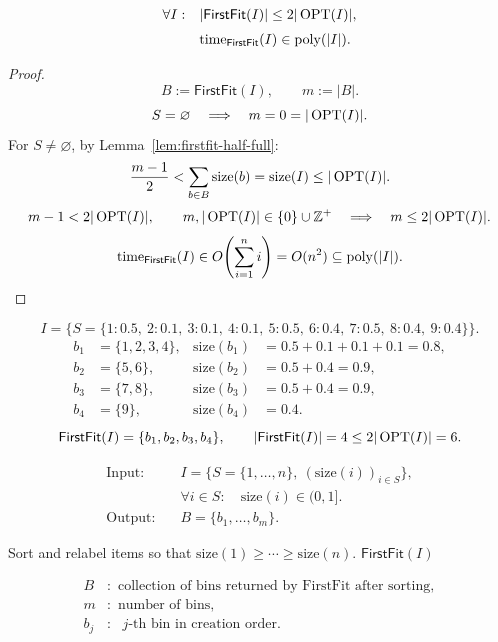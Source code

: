\documentclass[12pt,a4paper]{article}
\begin{document}
\begin{theorem}
\[
\begin{aligned}
\forall I:\quad &|\mathsf{FirstFit}(I)|\leq2|\operatorname{OPT}(I)|,\\[3pt]
&\mathrm{time}_{\mathsf{FirstFit}}(I)\in\operatorname{poly}(|I|).
\end{aligned}
\]
\end{theorem}
\begin{proof}
\[
B:=\mathsf{FirstFit}(I),\qquad m:=|B|.
\]
\[
S=\varnothing\quad\Longrightarrow\quad m=0=|\operatorname{OPT}(I)|.
\]
For $S\neq\varnothing$, by Lemma~\ref{lem:firstfit-half-full}:
\[
\frac{m-1}{2}<\sum_{b\in B}\mathrm{size}(b)
=\mathrm{size}(I)\leq|\operatorname{OPT}(I)|.
\]
\[
m-1<2|\operatorname{OPT}(I)|,\qquad m,|\operatorname{OPT}(I)|\in\{0\}\cup\mathbb Z^{+}
\quad\Longrightarrow\quad m\leq2|\operatorname{OPT}(I)|.
\]
\[
\mathrm{time}_{\mathsf{FirstFit}}(I)
\in O\!\left(\sum_{i=1}^n i\right)
=O(n^2)\subseteq\operatorname{poly}(|I|).
\]
\end{proof}

\noindent\begin{minipage}{\linewidth}
\begin{example}[FirstFit]
\[
I=\{S=\{1:0.5,\ 2:0.1,\ 3:0.1,\ 4:0.1,\ 5:0.5,\ 6:0.4,\
7:0.5,\ 8:0.4,\ 9:0.4\}\}.
\]
\[
\begin{aligned}
b_1&=\{1,2,3,4\},&\mathrm{size}(b_1)&=0.5+0.1+0.1+0.1=0.8,\\
b_2&=\{5,6\},&\mathrm{size}(b_2)&=0.5+0.4=0.9,\\
b_3&=\{7,8\},&\mathrm{size}(b_3)&=0.5+0.4=0.9,\\
b_4&=\{9\},&\mathrm{size}(b_4)&=0.4.
\end{aligned}
\]
\[
\mathsf{FirstFit}(I)=\{b_1,b_2,b_3,b_4\},\qquad
|\mathsf{FirstFit}(I)|=4\leq2|\operatorname{OPT}(I)|=6.
\]
\end{example}
\end{minipage}\par

\begin{definition}
\[
\begin{aligned}
\text{Input:}\quad&I=\{S=\{1,\ldots,n\},\ (\mathrm{size}(i))_{i\in S}\},\\
&\forall i\in S:\quad\mathrm{size}(i)\in(0,1].\\[3pt]
\text{Output:}\quad&B=\{b_1,\ldots,b_m\}.
\end{aligned}
\]
\begin{algorithm}[H]
\caption{$\mathsf{SortedFirstFit}(I)$}
\begin{algorithmic}[1]
\State Sort and relabel items so that $\mathrm{size}(1)\geq\cdots\geq\mathrm{size}(n)$.
\State \Return $\mathsf{FirstFit}(I)$
\end{algorithmic}
\end{algorithm}
\[
\begin{aligned}
B&:\text{ collection of bins returned by FirstFit after sorting},\\
m&:\text{ number of bins},\\
b_j&:\text{ }j\text{-th bin in creation order}.
\end{aligned}
\]
\end{definition}
\end{document}
